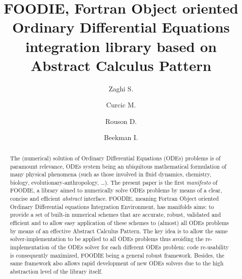 \documentclass[pdftex,preprint,3p,times,numbers]{elsarticle}
\begin{document}
\begin{frontmatter}

\title{FOODIE, Fortran Object oriented Ordinary Differential Equations integration library based on Abstract Calculus Pattern}

\author[insean]{Zaghi S.}
\address[insean]{CNR-INSEAN, Istituto Nazionale per Studi ed Esperienze di Architettura Navale, Via di Vallerano 139, Rome, Italy, 00128}

\author[rsmas]{Curcic M.}
\address[rsmas]{Ocean Sciences Rosenstiel School of Marine and Atmospheric Science, University of Miami, 4600 Rickenbacker Causeway Miami, FL 33149-1098 +1 305.421.4000}

\author[sourcery]{Rouson D.}
\address[sourcery]{Sourcery Institute 482 Michigan Ave., Berkeley, CA 94707}

\author[sourcery]{Beekman I.}

\begin{abstract}
The (numerical) solution of Ordinary Differential Equations (ODEs) problems is of paramount relevance, ODEs system being an ubiquitous mathematical formulation of many physical phenomena (such as those involved in fluid dynamics, chemistry, biology, evolutionary-anthropology, \dots). The present paper is the first \emph{manifesto} of FOODIE, a library aimed to numerically solve ODEs problems by means of a clear, concise and efficient \emph{abstract} interface. FOODIE, meaning Fortran Object oriented Ordinary Differential equations Integration Environment, has manifolds aims: to provide a set of built-in numerical schemes that are accurate, robust, validated and efficient and to allow easy application of these schemes to (almost) all ODEs problems by means of an effective Abstract Calculus Pattern. The key idea is to allow the same solver-implementation to be applied to all ODEs problems thus avoiding the re-implementation of the ODEs solver for each different ODEs problem: code re-usability is consequently maximized, FOODIE being a general robust framework. Besides, the same framework also allows rapid development of new ODEs solvers due to the high abstraction level of the library itself.


\end{abstract}
\end{frontmatter}
\end{document}
